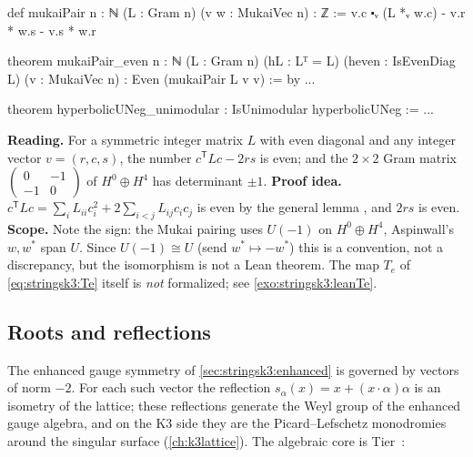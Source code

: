 \begin{leanbox}
\begin{leancode}
def mukaiPair {n : ℕ} (L : Gram n) (v w : MukaiVec n) : ℤ :=
  v.c ⬝ᵥ (L *ᵥ w.c) - v.r * w.s - v.s * w.r

theorem mukaiPair_even {n : ℕ} (L : Gram n) (hL : Lᵀ = L) (heven : IsEvenDiag L)
    (v : MukaiVec n) : Even (mukaiPair L v v) := by ...

theorem hyperbolicUNeg_unimodular : IsUnimodular hyperbolicUNeg := ...
\end{leancode}
\textbf{Reading.} For a symmetric integer matrix $L$ with even diagonal and any integer
vector $v=(r,c,s)$, the number $c^{\mathsf T}Lc-2rs$ is even; and the $2\times2$ Gram matrix
$\left(\begin{smallmatrix}0&-1\\-1&0\end{smallmatrix}\right)$ of $H^0\oplus H^4$ has determinant
$\pm1$. \textbf{Proof idea.} $c^{\mathsf T}Lc=\sum_iL_{ii}c_i^2+2\sum_{i<j}L_{ij}c_ic_j$ is even
by the general lemma , and $2rs$ is even.
\textbf{Scope.} Note the sign: the Mukai pairing uses $U(-1)$ on $H^0\oplus H^4$, Aspinwall's
$w,w^*$ span $U$. Since $U(-1)\cong U$ (send $w^*\mapsto-w^*$) this is a convention, not a
discrepancy, but the isomorphism is not a Lean theorem. The map $T_e$ of
\eqref{eq:stringsk3:Te} itself is \emph{not} formalized; see \cref{exo:stringsk3:leanTe}.
\end{leanbox}

\subsection{Roots and reflections}
The enhanced gauge symmetry of \cref{sec:stringsk3:enhanced} is governed by vectors of norm
$-2$. For each such vector the reflection $s_\alpha(x)=x+(x\cdot\alpha)\alpha$ is an isometry of
the lattice; these reflections generate the Weyl group of the enhanced gauge algebra, and on
the K3 side they are the Picard--Lefschetz monodromies around the singular surface
(\cref{ch:k3lattice}). The algebraic core is Tier~\TA:

